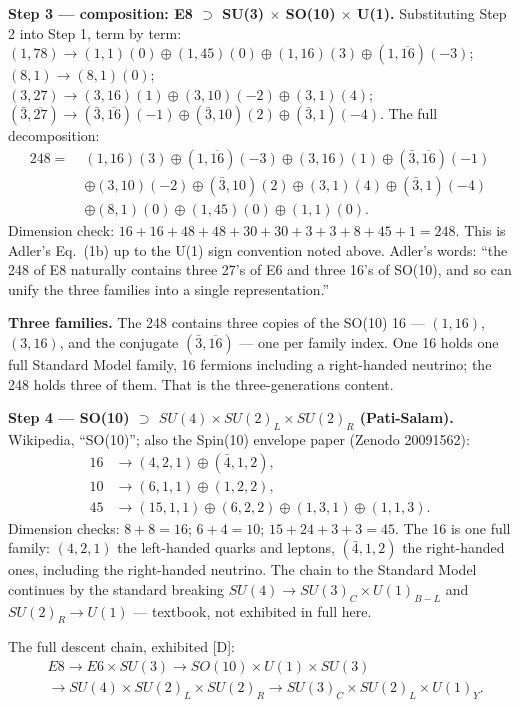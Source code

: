 \documentclass{alienfolio}
\begin{document}
\noindent\textbf{Step 3 --- composition: E8 $\supset$ SU(3) $\times$ SO(10) $\times$ U(1).} Substituting Step 2 into Step 1, term by term: $(1,78) \to (1,1)(0) \oplus (1,45)(0) \oplus (1,16)(3) \oplus (1,\overline{16})(-3)$; $(8,1) \to (8,1)(0)$; $(3,27) \to (3,16)(1) \oplus (3,10)(-2) \oplus (3,1)(4)$; $(\bar{3},\overline{27}) \to (\bar{3},\overline{16})(-1) \oplus (\bar{3},10)(2) \oplus (\bar{3},1)(-4)$. The full decomposition:
\[
\begin{aligned}
248 =\;& (1,16)(3) \oplus (1,\overline{16})(-3) \oplus (3,16)(1) \oplus (\bar{3},\overline{16})(-1) \\
& \oplus (3,10)(-2) \oplus (\bar{3},10)(2) \oplus (3,1)(4) \oplus (\bar{3},1)(-4) \\
& \oplus (8,1)(0) \oplus (1,45)(0) \oplus (1,1)(0).
\end{aligned}
\]
Dimension check: $16 + 16 + 48 + 48 + 30 + 30 + 3 + 3 + 8 + 45 + 1 = 248$. This is Adler's Eq.~(1b) up to the U(1) sign convention noted above. Adler's words: ``the 248 of E8 naturally contains three 27's of E6 and three 16's of SO(10), and so can unify the three families into a single representation.''

\noindent\textbf{Three families.} The 248 contains three copies of the SO(10) 16 --- $(1,16)$, $(3,16)$, and the conjugate $(\bar{3},\overline{16})$ --- one per family index. One 16 holds one full Standard Model family, 16 fermions including a right-handed neutrino; the 248 holds three of them. That is the three-generations content.

\noindent\textbf{Step 4 --- SO(10) $\supset$ $SU(4) \times SU(2)_L \times SU(2)_R$ (Pati-Salam).} Wikipedia, ``SO(10)''; also the Spin(10) envelope paper (Zenodo 20091562):
\[
\begin{aligned}
16 &\to (4,2,1) \oplus (\bar{4},1,2), \\
10 &\to (6,1,1) \oplus (1,2,2), \\
45 &\to (15,1,1) \oplus (6,2,2) \oplus (1,3,1) \oplus (1,1,3).
\end{aligned}
\]
Dimension checks: $8 + 8 = 16$; $6 + 4 = 10$; $15 + 24 + 3 + 3 = 45$. The 16 is one full family: $(4,2,1)$ the left-handed quarks and leptons, $(\bar{4},1,2)$ the right-handed ones, including the right-handed neutrino. The chain to the Standard Model continues by the standard breaking $SU(4) \to SU(3)_C \times U(1)_{B-L}$ and $SU(2)_R \to U(1)$ --- textbook, not exhibited in full here.

The full descent chain, exhibited [D]:
\[
\begin{aligned}
&E8 \to E6 \times SU(3) \to SO(10) \times U(1) \times SU(3) \\
&\to SU(4) \times SU(2)_L \times SU(2)_R \to SU(3)_C \times SU(2)_L \times U(1)_Y.
\end{aligned}
\]
\end{document}
